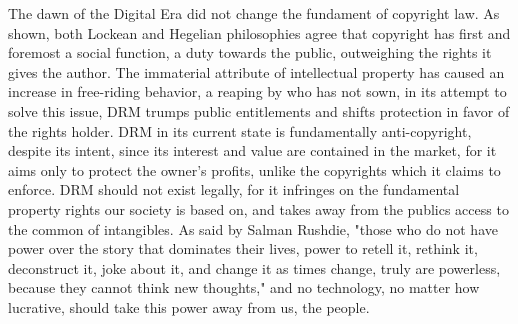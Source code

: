 \documentclass[12pt]{article}
\begin{document}
The dawn of the Digital Era did not change the fundament of copyright law. As shown, both Lockean and Hegelian philosophies agree that copyright has first and foremost a social function, a duty towards the public, outweighing the rights it gives the author. The immaterial attribute of intellectual property has caused an increase in free-riding behavior, a reaping by who has not sown, in its attempt to solve this issue, DRM trumps public entitlements and shifts protection in favor of the rights holder. DRM in its current state is fundamentally anti-copyright, despite its intent, since its interest and value are contained in the market, for it aims only to protect the owner's profits, unlike the copyrights which it claims to enforce. DRM should not exist legally, for it infringes on the fundamental property rights our society is based on, and takes away from the publics access to the common of intangibles. As said by Salman Rushdie, "those who do not have power over the story that dominates their lives, power to retell it, rethink it, deconstruct it, joke about it, and change it as times change, truly are powerless, because they cannot think new thoughts,"\cite{rushdie} and no technology, no matter how lucrative, should take this power away from us, the people.
\newpage
\end{document}
